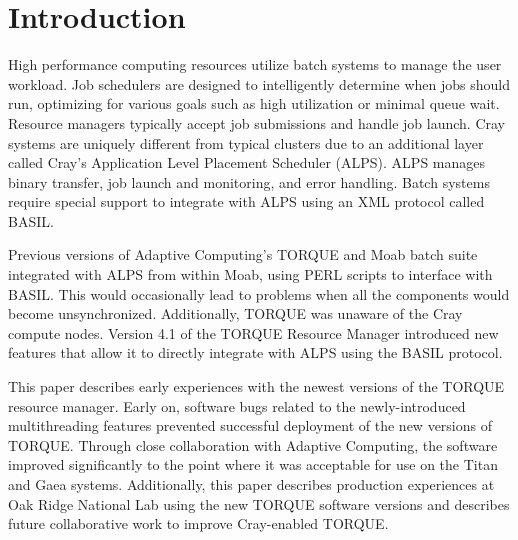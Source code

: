 \section{Introduction}

High performance computing resources utilize batch systems to manage the user
workload. Job schedulers are designed to intelligently determine when jobs
should run, optimizing for various goals such as high utilization or minimal
queue wait. Resource managers typically accept job submissions and handle job
launch. Cray systems are uniquely different from typical clusters due to an
additional layer called Cray’s Application Level Placement Scheduler (ALPS).
ALPS manages binary transfer, job launch and monitoring, and error handling.
Batch systems require special support to integrate with ALPS using an XML
protocol called BASIL.

Previous versions of Adaptive Computing’s TORQUE and Moab batch suite
integrated with ALPS from within Moab, using PERL scripts to interface with
BASIL. This would occasionally lead to problems when all the components would
become unsynchronized. Additionally, TORQUE was unaware of the Cray compute
nodes. Version 4.1 of the TORQUE Resource Manager introduced new features that
allow it to directly integrate with ALPS using the BASIL protocol.

This paper describes early experiences with the newest versions of the TORQUE
resource manager. Early on, software bugs related to the newly-introduced
multithreading features prevented successful deployment of the new versions of
TORQUE. Through close collaboration with Adaptive Computing, the software
improved significantly to the point where it was acceptable for use on the
Titan and Gaea systems. Additionally, this paper describes production
experiences at Oak Ridge National Lab using the new TORQUE software versions
and describes future collaborative work to improve Cray-enabled TORQUE.
